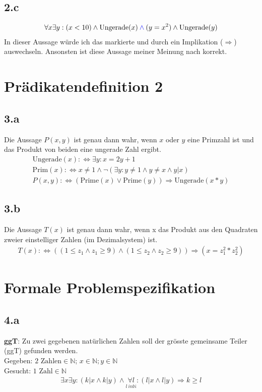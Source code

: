 \documentclass[10pt,ngerman]{scrartcl}
\begin{document}
\subsection{2.c}
\setcounter{equation}{0}
\begin{align*}
\forall x \exists y: (x < 10) \wedge \text{Ungerade(}x\text{)} \color{blue}\wedge\color{black} (y = x^2) \wedge \text{Ungerade(}y\text{)}
\end{align*}
In dieser Aussage würde ich das markierte und durch ein Implikation ($\Rightarrow$) auswechseln. Ansonsten ist diese Aussage meiner Meinung nach korrekt.
\pagebreak
\section{Prädikatendefinition 2}
\subsection{3.a}
Die Aussage $P(x, y)$ ist genau dann wahr, wenn $x$ oder $y$ eine Primzahl ist und das
Produkt von beiden eine ungerade Zahl ergibt.
\setcounter{equation}{0}
\begin{align}
\text{Ungerade}(x):\Leftrightarrow \exists y : x = 2y +1\\
\text{Prim}(x): \Leftrightarrow x \ne 1 \wedge \neg (\exists y : y \ne 1 \wedge y \ne x \wedge y|x)\\
P(x,y) :\Leftrightarrow (\text{Prime}(x) \vee \text{Prime}(y)) \Rightarrow \text{Ungerade}(x * y)
\end{align}
\subsection{3.b}
Die Aussage $T(x)$ ist genau dann wahr, wenn x das Produkt aus den Quadraten zweier
einstelliger Zahlen (im Dezimalsystem) ist.
\setcounter{equation}{0}
\begin{align*}
T(x) :\Leftrightarrow ((1 \leq z_1 \wedge z_1 \geq 9) \wedge (1 \leq z_2 \wedge z_2 \geq 9)) \Rightarrow (x = z_1^2*z_2^2)
\end{align*}
\section{Formale Problemspezifikation}
\subsection{4.a}
\textbf{ggT}: Zu zwei gegebenen natürlichen Zahlen soll der grösste gemeinsame Teiler (ggT) gefunden werden.\vspace{0.5 cm}\\
Gegeben: $2 \text{ Zahlen} \in \mathbb{N}$; $x \in \mathbb{N}; y \in \mathbb{N}$\\
Gesucht: $1 \text{ Zahl} \in \mathbb{N}$
\setcounter{equation}{0}
\begin{align*}
\exists x \exists y : (k|x \wedge k|y) \wedge \underset{l \ in \mathbb{N}}{\forall l} : (l|x \wedge l|y) \Rightarrow k \geq l
\end{align*}
\end{document}
